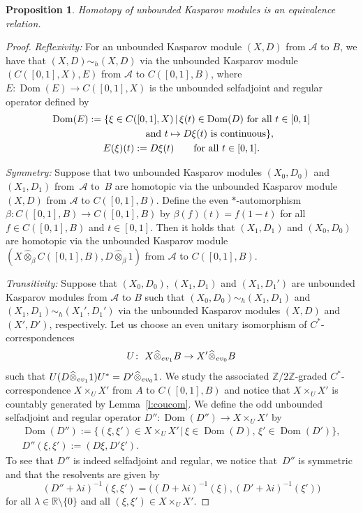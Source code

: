 \documentclass[11pt]{article}
\numberwithin{equation}{section}
\newtheorem{prop}[Theorem]{Proposition}
 { \theoremstyle{definition}
\newtheorem{dfn}[Theorem]{Definition}
\newtheorem{exa}[Theorem]{Example}
\newtheorem{rem}[Theorem]{Remark} }
\newcommand{\hot}{\widehat \otimes}
\newcommand{\ti}{\times}
\newcommand{\zz}{\mathbb{Z}}
\newcommand{\rr}{\mathbb{R}}
\newcommand{\be}{\beta}
\newcommand{\la}{\lambda}
\newcommand{\s}[1]{\mathscr{#1}}
\begin{document}
\begin{prop}\label{p:unbhom}
Homotopy of unbounded Kasparov modules is an equivalence relation.
\end{prop}
\begin{proof}{\it Reflexivity:} For an unbounded Kasparov module $(X,D)$ from $\s A$ to $B$, we have that $(X,D) \sim_h (X,D)$ via the unbounded Kasparov module $( C([0,1],X), E)$ from $\s A$ to $C([0,1],B)$, where $E\colon \operatorname{Dom}(E) \to C( [0,1],X)$ is the unbounded selfadjoint and regular operator defined by
\begin{gather*}
\operatorname{Dom}(E) := \{ \xi \in C( [0,1],X) \,|\, \xi(t) \in \operatorname{Dom}(D) \ \text{for all} \ t \in [0,1] \\
\hphantom{\operatorname{Dom}(E) := \{}{} \text{and} \ t \mapsto D \xi(t) \ \text{is continuous} \}, \\
E(\xi)(t) := D \xi(t) \qquad \text{for all } t \in [0,1] .
\end{gather*}

{\it Symmetry:} Suppose that two unbounded Kasparov modules $(X_0,D_0)$ and $(X_1,D_1)$ from~$\s A$ to~$B$ are homotopic via the unbounded Kasparov module $(X,D)$ from $\s A$ to $C( [0,1],B)$. Define the even $*$-automorphism $\be\colon C( [0,1],B) \to C( [0,1] , B)$ by $\be(f)(t) = f(1 - t)$ for all $f \in C( [0,1],B)$ and $t \in [0,1]$. Then it holds that $(X_1,D_1)$ and $(X_0,D_0)$ are homotopic via the unbounded Kasparov module $(X \hot_{\be} C( [0,1],B), D \hot_{\be} 1)$ from $\s A$ to $C([0,1],B)$.

{\it Transitivity:} Suppose that $(X_0,D_0)$, $(X_1,D_1)$ and $(X_1,D_1')$ are unbounded Kasparov modules from $\s A$ to $B$ such that $(X_0,D_0) \sim_h (X_1,D_1)$ and $(X_1,D_1) \sim_h (X_1',D_1')$ via the unbounded Kasparov modules $(X,D)$ and $(X', D')$, respectively. Let us choose an even unitary isomorphism of $C^*$-correspondences
\[
U\colon \ X \hot_{{\rm ev}_1} B \to X' \hot_{{\rm ev}_0} B
\]
such that $U (D \hot_{{\rm ev}_1} 1) U^* = D' \hot_{{\rm ev}_0} 1$. We study the associated $\zz/2\zz$-graded $C^*$-correspondence $X \ti_U X'$ from $A$ to $C([0,1],B)$ and notice that $X \ti_U X'$ is countably generated by Lemma~\ref{l:coucom}. We define the odd unbounded selfadjoint and regular operator $D''\colon \operatorname{Dom}(D'') \to X \ti_U X'$ by
\begin{gather*}
\operatorname{Dom}(D'') := \{ (\xi,\xi') \in X \ti_U X' \,|\, \xi \in \operatorname{Dom}(D) , \, \xi' \in \operatorname{Dom}(D') \}, \\
D''(\xi,\xi') := (D \xi, D' \xi') .
\end{gather*}
To see that $D''$ is indeed selfadjoint and regular, we notice that~$D''$ is symmetric and that the resolvents are given by
\[
(D'' + \la i )^{-1} (\xi,\xi') = \big( (D + \la i )^{-1}(\xi), (D' + \la i )^{-1}(\xi')\big)
\]
for all $\la \in \rr \setminus \{0\}$ and all $(\xi,\xi') \in X \ti_U X'$.


\end{proof}
\end{document}
